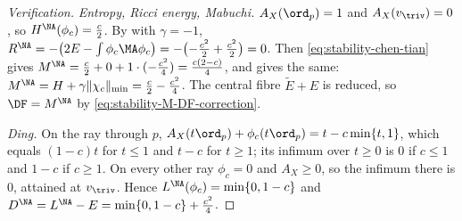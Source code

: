 \begin{proof}[Verification]
\emph{Entropy, Ricci energy, Mabuchi.}  $A_X(\ord_p)=1$ and
$A_X(v_{\triv})=0$, so $H^{\NA}(\phi_c)=\frac c2$.  By
 with $\gamma=-1$,
$R^{\NA}=-\bigl(2E-\int\phi_c\MA\phi_c\bigr)
=-\bigl(-\frac{c^2}2+\frac{c^2}2\bigr)=0$.  Then
\eqref{eq:stability-chen-tian} gives
$M^{\NA}=\frac c2+0+1\cdot(-\frac{c^2}4)=\frac{c(2-c)}4$, and
 gives the same:
$M^{\NA}=H+\gamma\|\chi_c\|_{\min}=\frac c2-\frac{c^2}4$.  The central
fibre $\widetilde E+E$ is reduced, so $\DF=M^{\NA}$ by
\eqref{eq:stability-M-DF-correction}.

\emph{Ding.}  On the ray through $p$, $A_X(t\ord_p)+\phi_c(t\ord_p)
=t-c\min\{t,1\}$, which equals $(1-c)t$ for $t\le1$ and $t-c$ for
$t\ge1$; its infimum over $t\ge0$ is $0$ if $c\le1$ and $1-c$ if
$c\ge1$.  On every other ray $\phi_c=0$ and $A_X\ge0$, so the
infimum there is $0$, attained at $v_{\triv}$.  Hence
$L^{\NA}(\phi_c)=\min\{0,1-c\}$ and
$D^{\NA}=L^{\NA}-E=\min\{0,1-c\}+\frac{c^2}4$.
\end{proof}

